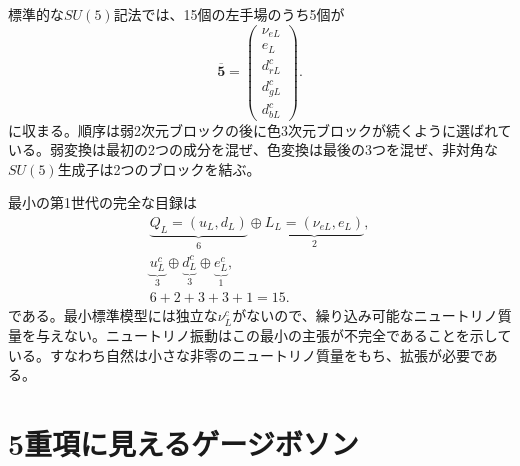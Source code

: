 標準的な\(SU(5)\)記法では、15個の左手場のうち5個が
\begin{equation}
\overline{\mathbf5}
=
\begin{pmatrix}
\nu_{eL}\\
e_L\\
d^c_{rL}\\
d^c_{gL}\\
d^c_{bL}
\end{pmatrix}.
\label{eq:l10-fivebar}
\end{equation}
に収まる。順序は弱2次元ブロックの後に色3次元ブロックが続くように選ばれている。弱変換は最初の2つの成分を混ぜ、色変換は最後の3つを混ぜ、非対角な\(SU(5)\)生成子は2つのブロックを結ぶ。


最小の第1世代の完全な目録は
\begin{equation}
\begin{gathered}
\underbrace{Q_L=(u_L,d_L)}_{6}
\oplus
\underbrace{L_L=(\nu_{eL},e_L)}_{2},\\
\underbrace{u^c_L}_{3}
\oplus
\underbrace{d^c_L}_{3}
\oplus
\underbrace{e^c_L}_{1},\\
6+2+3+3+1=15.
\end{gathered}
\label{eq:l10-fifteen}
\end{equation}
である。最小標準模型には独立な\(\nu^c_L\)がないので、繰り込み可能なニュートリノ質量を与えない。ニュートリノ振動はこの最小の主張が不完全であることを示している。すなわち自然は小さな非零のニュートリノ質量をもち、拡張が必要である。

\begin{classroomqa}
\end{classroomqa}

\section{5重項に見えるゲージボソン}

